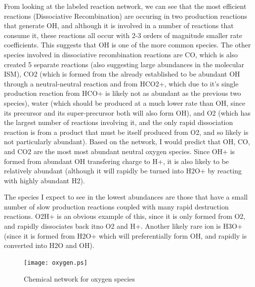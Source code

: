 \documentclass{article}
\begin{document}
From looking at the labeled reaction network,
we can see that the most efficient reactions (Dissociative Recombination) are 
occuring in two production reactions that generate OH, and although it is
involved in a number of reactions that consume it, these reactions all occur
with 2-3 orders of magnitude smaller rate coefficients.  This suggests that OH
is one of the more common species.  The other species involved in dissociative
recombination reactions are CO, which is also created 5 separate reactions (also
suggesting large abundances in the molecular ISM), CO2 (which is formed from the
already established to be abundant OH through a neutral-neutral reaction and
from HCO2+, which due to it's single production reaction from HCO+ is likely not
as abundant as the previous two species), water (which should be produced at a
much lower rate than OH, since its precursor and its super-precursor both will
also form OH), and O2 (which has the largest number of reactions involving it,
and the only rapid dissociation reaction is from a product that must be itself
produced from O2, and so likely is not particularly abundant).  Based on the
network, I would predict that OH, CO, and CO2 are the most most abundant neutral
oxygen species.  Since OH+ is formed from abundant OH transfering charge to H+,
it is also likely to be relatively abundant (although it will rapidly be turned
into H2O+ by reacting with highly abundant H2).  

The species I expect to see in
the lowest abundances are those that have a small number of slow production
reactions coupled with many rapid destruction reactions.  O2H+ is an obvious
example of this, since it is only formed from O2, and rapidly dissociates back
itno O2 and H+.  Another likely rare ion is H3O+ (since it is formed from H2O+ 
which will preferentially form OH, and rapidly is converted into H2O and OH).
\begin{figure}
	\centering
	\texttt{[image: oxygen.ps]}
	\caption{Chemical network for oxygen species}
\end{figure}\\
\end{document}
